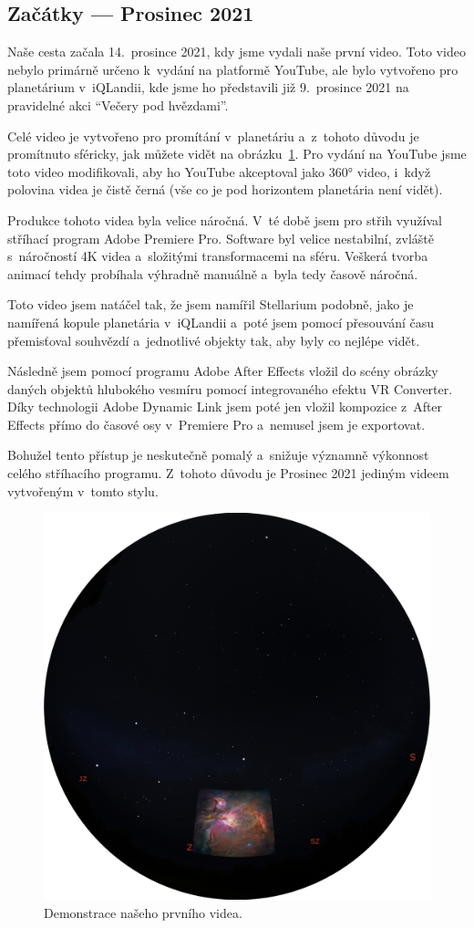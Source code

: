 \documentclass[12pt,a4paper,titlepage]{article}
\begin{document}
\subsection{Začátky --- Prosinec 2021}
Naše cesta začala 14.\ prosince 2021, kdy jsme vydali naše první video. Toto video nebylo primárně určeno k~vydání na platformě YouTube, ale bylo vytvořeno pro planetárium v~iQLandii, kde jsme ho představili již 9.\ prosince 2021 na pravidelné akci \enquote{Večery pod hvězdami}. 

Celé video je vytvořeno pro promítání v~planetáriu a~z~tohoto důvodu je promítnuto sféricky, jak můžete vidět na obrázku~\ref{img:prosinec}. Pro vydání na YouTube jsme toto video modifikovali, aby ho YouTube akceptoval jako 360° video, i~když polovina videa je čistě černá (vše co je pod horizontem planetária není vidět). 

Produkce tohoto videa byla velice náročná. V~té době jsem pro střih využíval stříhací program Adobe Premiere Pro. Software byl velice nestabilní, zvláště s~náročností 4K videa a~složitými transformacemi na sféru. Veškerá tvorba animací tehdy probíhala výhradně manuálně a~byla tedy časově náročná. 

Toto video jsem natáčel tak, že jsem namířil Stellarium podobně, jako je namířená kopule planetária v~iQLandii a~poté jsem pomocí přesouvání času přemisťoval souhvězdí a~jednotlivé objekty tak, aby byly co nejlépe vidět. 

Následně jsem pomocí programu Adobe After Effects vložil do scény obrázky daných objektů hlubokého vesmíru pomocí integrovaného efektu VR Converter. Díky technologii Adobe Dynamic Link jsem poté jen vložil kompozice z~After Effects přímo do časové osy v~Premiere Pro a~nemusel jsem je exportovat. 

Bohužel tento přístup je neskutečně pomalý a~snižuje významně výkonnost celého stříhacího programu. Z~tohoto důvodu je Prosinec 2021 jediným videem vytvořeným v~tomto stylu.

\begin{figure}[ht]
	\centering
	\includegraphics[width=.7\textwidth]{prosinec.eps}
	\caption{Demonstrace našeho prvního videa.}\label{img:prosinec}
\end{figure}
\end{document}
